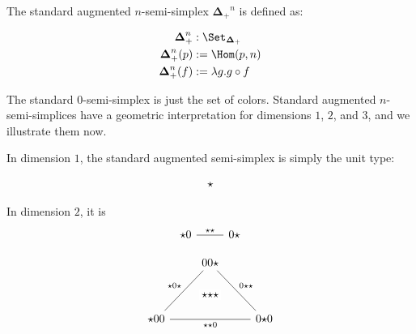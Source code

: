 \documentclass[10pt]{art.cls/art}
\newcommand{\DeltaPlus}{\ensuremath{\boldsymbol{\Delta}_+}}
\newcommand{\kstar}{{\star}}
\begin{document}
\begin{definition}[$\DeltaPlus^n$]
  The standard augmented $n$-semi-simplex $\DeltaPlus^n$ is defined as:

  \begin{align*}
    \DeltaPlus^n    & : \Set_{\DeltaPlus}      \\
    \DeltaPlus^n(p) & := \Hom(p, n)            \\
    \DeltaPlus^n(f) & := \lambda g . g \circ f
  \end{align*}
\end{definition}

The standard $0$-semi-simplex is just the set of colors. Standard augmented $n$-semi-simplices have a geometric interpretation for dimensions $1$, $2$, and $3$, and we illustrate them now.

\begin{example}[$\DeltaPlus^1$]
  In dimension $1$, the standard augmented semi-simplex is simply the unit type:

  \begin{equation*}
    \begin{tikzcd}
      \star
    \end{tikzcd}
  \end{equation*}
\end{example}

\begin{example}[$\DeltaPlus^2$]
  In dimension $2$, it is
  \begin{equation*}
    \begin{tikzcd}
      \kstar0 \arrow[r, dash, "\kstar\kstar"] & 0\kstar
    \end{tikzcd}
  \end{equation*}
\end{example}

\begin{example}[$\DeltaPlus^3$]
  \begin{equation*}
    \begin{tikzcd}
      & |[alias=F]|00\kstar \arrow[ddr, dash, "0\kstar\kstar"] & \\\\
      \kstar00 \arrow[rr, dash, "\kstar\kstar0"{name=T, below}]\arrow[uur, dash, "\kstar0\kstar"] && 0\kstar0 \\
      \arrow[rightarrow, from=F, to=T, phantom, "\kstar\kstar\kstar" description]
    \end{tikzcd}
  \end{equation*}
\end{example}
\end{document}

